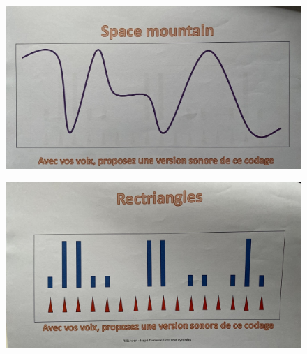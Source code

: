 \documentclass[12pt]{article}
\begin{document}
\begin{figure}[h!]
    \centering
    \includegraphics[scale=0.15]{./images/musique_2.jpeg}
\end{figure}

\begin{figure}[h!]
    \centering
    \includegraphics[scale=0.15]{./images/musique_3.jpeg}
\end{figure}
\end{document}
